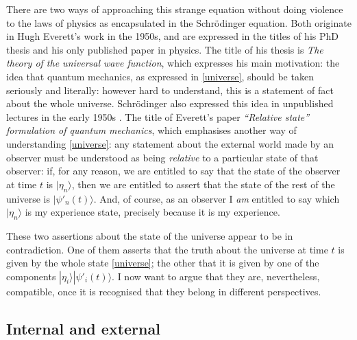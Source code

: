 \documentclass[12pt,reqno]{article}
\renewcommand{\(}{\left(}
\renewcommand{\)}{\right)}
\newcommand{\<}{\langle}
\renewcommand{\>}{\rangle}
\theoremstyle{plain} %
\begin{document}
There are two ways of approaching this strange equation without doing violence to the laws of physics as encapsulated in the Schr\"odinger equation. Both originate in Hugh Everett's work in the 1950s, and are expressed in the titles of his PhD thesis and his only published paper in physics. The title of his thesis is {\it The theory of the universal wave function}, which expresses his main motivation: the idea that quantum mechanics, as expressed in \eqref{universe}, should be taken seriously and literally: however hard to understand, this is a statement of fact about the whole universe. Schr\"odinger also expressed this idea in unpublished lectures in the early 1950s \cite{Schrodinger:interpretns}. The title of Everett's paper {\it ``Relative state'' formulation of quantum mechanics}, which emphasises another way of understanding \eqref{universe}: any statement about the external world made by an observer must be understood as being \emph{relative} to a particular state of that observer: if, for any reason, we are entitled to say that the state of the observer at time $t$ is $|\eta_n\>$, then we are entitled to assert that the state of the rest of the universe is $|\psi'_n(t)\>$. And, of course, as an observer I \emph{am} entitled to say which $|\eta_n\>$ is my experience state, precisely because it is my experience.

These two assertions about the state of the universe appear to be in contradiction. One of them asserts that the truth about the universe at time $t$ is given by the whole state \eqref{universe}; the other that it is given by one of the components $|\eta_i\>|\psi'_i(t)\>$. I now want to argue that they are, nevertheless, compatible, once it is recognised that they belong in different perspectives.
 


\subsection{Internal and external}
\label{susec:intext}
\end{document}
